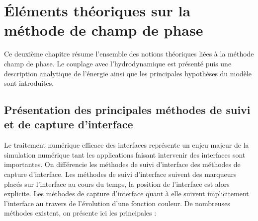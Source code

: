 \chapter{Éléments théoriques sur la méthode de champ de phase} \label{chap:2}
Ce deuxième chapitre résume l'ensemble des notions théoriques liées à la méthode champ de phase. Le couplage avec l'hydrodynamique est présenté puis une description analytique de l'énergie ainsi que les principales hypothèses du modèle sont introduites. 
\section{Présentation des principales méthodes de suivi et de capture d'interface}

Le traitement numérique efficace des interfaces représente un enjeu majeur de la simulation numérique tant les applications faisant intervenir des interfaces sont importantes. On différencie les méthodes de suivi d'interface des méthodes de capture d'interface. Les méthodes de suivi d'interface suivent des marqueurs placés sur l'interface au cours du temps, la position de l'interface est alors explicite. Les méthodes de capture d'interface quant à elle suivent implicitement l'interface au travers de l'évolution d'une fonction couleur. De nombreuses méthodes existent, on présente ici les principales :
